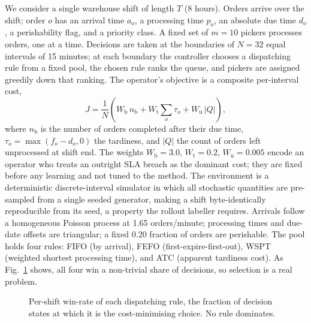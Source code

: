 \documentclass[conference]{IEEEtran}
\begin{document}
We consider a single warehouse shift of length $T$ (8 hours). Orders arrive over
the shift; order $o$ has an arrival time $a_o$, a processing time $p_o$, an
absolute due time $d_o$, a perishability flag, and a priority class. A fixed set of
$m{=}10$ pickers processes orders, one at a time. Decisions are taken at the
boundaries of $N{=}32$ equal intervals of 15 minutes; at each boundary the
controller chooses a dispatching rule from a fixed pool, the chosen rule ranks the
queue, and pickers are assigned greedily down that ranking. The operator's
objective is a composite per-interval cost,
\begin{equation}
J = \frac{1}{N}\left( W_{\text{b}}\, n_{\text{b}}
   + W_{\text{t}} \sum_{o} \tau_o + W_{\text{u}}\, |Q| \right),
\label{eq:cost}
\end{equation}
where $n_{\text{b}}$ is the number of orders completed after their due time,
$\tau_o = \max(f_o - d_o, 0)$ the tardiness, and $|Q|$ the count of orders left
unprocessed at shift end. The weights $W_{\text{b}}{=}3.0$, $W_{\text{t}}{=}0.2$,
$W_{\text{u}}{=}0.005$ encode an operator who treats an outright SLA breach as the
dominant cost; they are fixed before any learning and not tuned to the method. The
environment is a deterministic discrete-interval simulator in which all stochastic
quantities are pre-sampled from a single seeded generator, making a shift
byte-identically reproducible from its seed, a property the rollout labeller
requires. Arrivals follow a homogeneous Poisson process at 1.65 orders/minute;
processing times and due-date offsets are triangular; a fixed 0.20 fraction of
orders are perishable. The pool holds four rules: FIFO (by arrival), FEFO
(first-expire-first-out), WSPT (weighted shortest processing time), and ATC
(apparent tardiness cost). As Fig.~\ref{fig:diversity} shows, all four win a
non-trivial share of decisions, so selection is a real problem.

\begin{figure}[t]
\centering
{}
\caption{Per-shift win-rate of each dispatching rule, the fraction of decision
states at which it is the cost-minimising choice. No rule dominates.}
\label{fig:diversity}
\end{figure}
\end{document}
